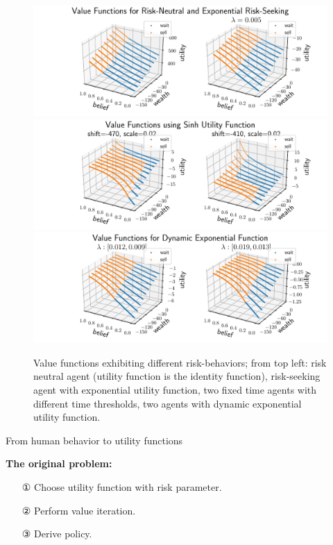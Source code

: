 \begin{figure}
    \includegraphics[width=0.98\linewidth]{img/exp_policy.pdf}\\
    \vspace{1cm}
    \includegraphics[width=0.98\linewidth]{img/sinh_policy.pdf}\\
    \vspace{1cm}
    \includegraphics[width=0.98\linewidth]{img/dyn_policy.pdf}
    \caption{Value functions exhibiting different risk-behaviors; from top left: risk neutral agent (utility function is the identity function), risk-seeking agent with exponential utility function, two fixed time agents with different time thresholds, two agents with dynamic exponential utility function.}
\end{figure}

\Large{From human behavior to utility functions}


\normalsize
\textbf{The original problem:}
\begin{itemize}
\item[①] Choose utility function with risk parameter.
\item[②] Perform value iteration.
\item[③] Derive policy.
\end{itemize}

